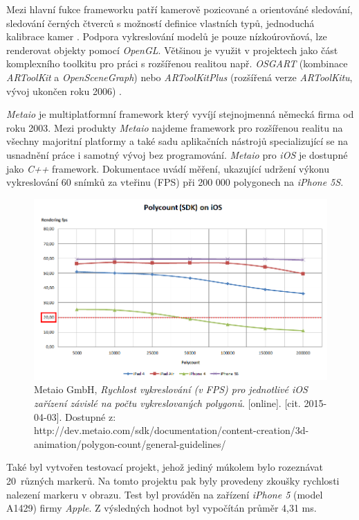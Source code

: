 \documentclass[twoside,12pt]{article}
\begin{document}
Mezi hlavní fukce frameworku patří kamerově pozicované a orientováné sledování, sledování černých čtverců s možností definice vlastních typů, jednoduchá kalibrace kamer \cite{artoolkit_features}. Podpora vykreslování modelů je pouze nízkoúrovňová, lze renderovat objekty pomocí \textit{OpenGL}. Většinou je využit v projektech jako část komplexního toolkitu pro práci s rozšířenou realitou např. \textit{OSGART} (kombinace \textit{ARToolKit} a \textit{OpenSceneGraph}) \cite{osgart} nebo \textit{ARToolKitPlus} (rozšířená verze \textit{ARToolKitu}, vývoj ukončen roku 2006) \cite{wagner_schmalstieg}. 

\textit{Metaio} je multiplatformní framework který vyvíjí stejnojmenná německá firma od roku 2003. Mezi produkty \textit{Metaio} najdeme framework pro rozšířenou realitu na všechny majoritní platformy a také sadu aplikačních nástrojů specializující se na usnadnění práce i samotný vývoj bez programování. \textit{Metaio} pro \textit{iOS} je dostupné jako \textit{C++} framework. 
Dokumentace uvádí měření, ukazující udržení výkonu vykreslování 60 snímků za vteřinu (FPS) při 200 000 polygonech na \textit{iPhone 5S}.

\begin{figure}[H]
\centering
    \includegraphics[width=424px, center]{images/Polycount_SDK_iOS_20fps.png}
\captionsetup{justification=centering}
    \caption{Metaio GmbH, \textit{Rychlost vykreslování (v FPS) pro jednotlivé iOS zařízení závislé na počtu vykreslovaných polygonů}.
	[online]. [cit. 2015-04-03]. 
	Dostupné z: http://dev.metaio.com/sdk/documentation/content-creation/3d-animation/polygon-count/general-guidelines/}
    \label{metaio_benchmark}
\end{figure}

Také byl vytvořen testovací projekt, jehož jediný múkolem bylo rozeznávat 20~různých markerů. Na tomto projektu pak byly provedeny zkoušky rychlosti nalezení markeru v obrazu. Test byl prováděn na zařízení \textit{iPhone 5} (model A1429) firmy \textit{Apple}. Z výsledných hodnot byl vypočítán průměr 4,31 ms. 
\end{document}
